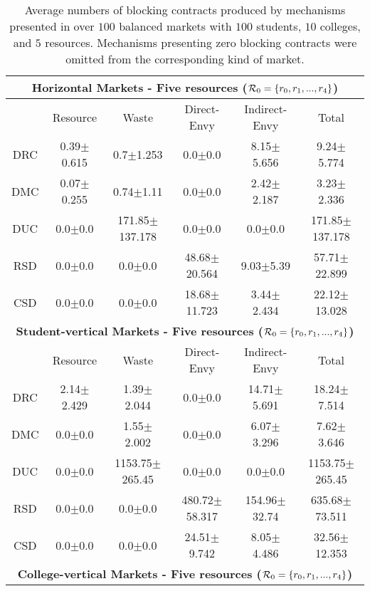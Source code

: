 \begin{table}[ht]
\centering
\small{
\caption{Average numbers of blocking contracts produced by mechanisms presented in  over $100$ balanced markets with $100$ students, $10$ colleges, and $5$ resources. Mechanisms presenting zero blocking contracts were omitted from the corresponding kind of market.}
\begin{tabular}{cccccc}
\toprule
\multicolumn{6}{c}{\textbf{Horizontal Markets - Five resources ($\operatorname{{\color{black}\mathcal{R}}}_0 = \{r_0,r_1,...,r_4\}$)}}\\
\toprule
& Resource   & Waste   & Direct-Envy   & Indirect-Envy       & Total    \\
\hline
DRC & 0.39$\pm$0.615  & 0.7$\pm$1.253      & 0.0$\pm$0.0       & 8.15$\pm$5.656 & 9.24$\pm$5.774     \\
DMC & 0.07$\pm$0.255  & 0.74$\pm$1.11      & 0.0$\pm$0.0       & 2.42$\pm$2.187 & 3.23$\pm$2.336     \\
DUC & 0.0$\pm$0.0     & 171.85$\pm$137.178 & 0.0$\pm$0.0       & 0.0$\pm$0.0    & 171.85$\pm$137.178 \\
RSD & 0.0$\pm$0.0     & 0.0$\pm$0.0        & 48.68$\pm$20.564  & 9.03$\pm$5.39  & 57.71$\pm$22.899   \\
CSD & 0.0$\pm$0.0     & 0.0$\pm$0.0        & 18.68$\pm$11.723  & 3.44$\pm$2.434 & 22.12$\pm$13.028   \\
\toprule
\multicolumn{6}{c}{\textbf{Student-vertical Markets - Five resources ($\operatorname{{\color{black}\mathcal{R}}}_0 = \{r_0,r_1,...,r_4\}$)}}\\
\toprule
& Resource   & Waste   & Direct-Envy   & Indirect-Envy    & Total \\
\hline
DRC & 2.14$\pm$2.429  & 1.39$\pm$2.044     & 0.0$\pm$0.0       & 14.71$\pm$5.691  & 18.24$\pm$7.514    \\
DMC & 0.0$\pm$0.0     & 1.55$\pm$2.002     & 0.0$\pm$0.0       & 6.07$\pm$3.296   & 7.62$\pm$3.646     \\
DUC & 0.0$\pm$0.0     & 1153.75$\pm$265.45 & 0.0$\pm$0.0       & 0.0$\pm$0.0      & 1153.75$\pm$265.45 \\
RSD & 0.0$\pm$0.0     & 0.0$\pm$0.0        & 480.72$\pm$58.317 & 154.96$\pm$32.74 & 635.68$\pm$73.511  \\
CSD & 0.0$\pm$0.0     & 0.0$\pm$0.0        & 24.51$\pm$9.742   & 8.05$\pm$4.486   & 32.56$\pm$12.353   \\
\toprule
\multicolumn{6}{c}{\textbf{College-vertical Markets - Five resources ($\operatorname{{\color{black}\mathcal{R}}}_0 = \{r_0,r_1,...,r_4\}$)}}\\

\end{tabular}}
\end{table}

